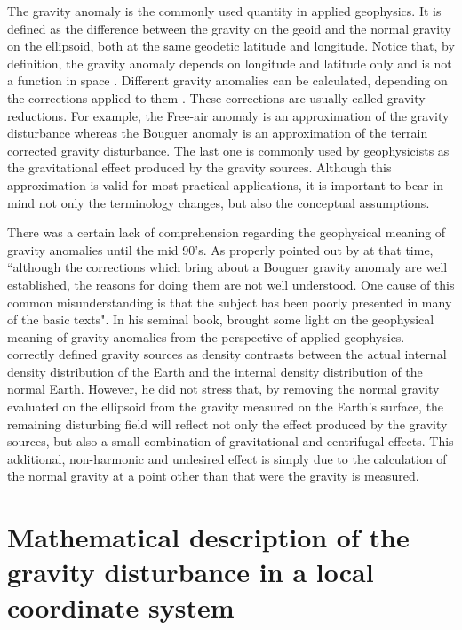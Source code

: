 \documentclass[extra]{gji}
\begin{document}
The gravity anomaly is the commonly used quantity in applied 
geophysics. It is defined as the difference
between the gravity on the geoid and the normal gravity on the ellipsoid,
both at the same geodetic latitude and longitude.
Notice that, by definition, the gravity anomaly depends on 
longitude and latitude only and is not a function in space 
\citep{barthelmes2013}.
Different gravity anomalies can be calculated, depending on the
corrections applied to them \citep{blakely1996, hofmann-wellenhof-moritz2005}.
These corrections are usually called gravity reductions.
For example, the Free-air anomaly is an approximation of the
gravity disturbance whereas the Bouguer anomaly
is an approximation of the terrain corrected gravity disturbance.
The last one is commonly used by geophysicists as the
gravitational effect produced by the gravity sources.
Although this approximation is valid for most practical applications,
it is important to bear in mind not only the terminology 
changes, but also the conceptual assumptions.

There was a certain lack of comprehension regarding the
geophysical meaning of gravity anomalies until the
mid 90's.
As properly pointed out by \citet{chapin1996} at that time, 
``although the corrections which bring about a Bouguer 
gravity anomaly are well established, the reasons for doing
them are not well understood. One cause of this common 
misunderstanding is that the subject has been poorly presented in
many of the basic texts".
In his seminal book, \citet{blakely1996} brought some light
on the geophysical meaning of gravity anomalies from the 
perspective of applied geophysics. \citet{blakely1996} correctly
defined gravity sources as density contrasts between the actual
internal density distribution of the Earth and the internal density
distribution of the normal Earth.
However, he did not stress that, by removing the normal gravity 
evaluated on the ellipsoid from the gravity measured 
on the Earth's surface, the remaining disturbing field will reflect 
not only the effect produced by the gravity sources, but also a
small combination of gravitational and centrifugal effects.
This additional, non-harmonic and undesired effect is 
simply due to the calculation of the normal gravity at a point
other than that were the gravity is measured.


\section{Mathematical description of the gravity disturbance in a local coordinate system}
\end{document}
